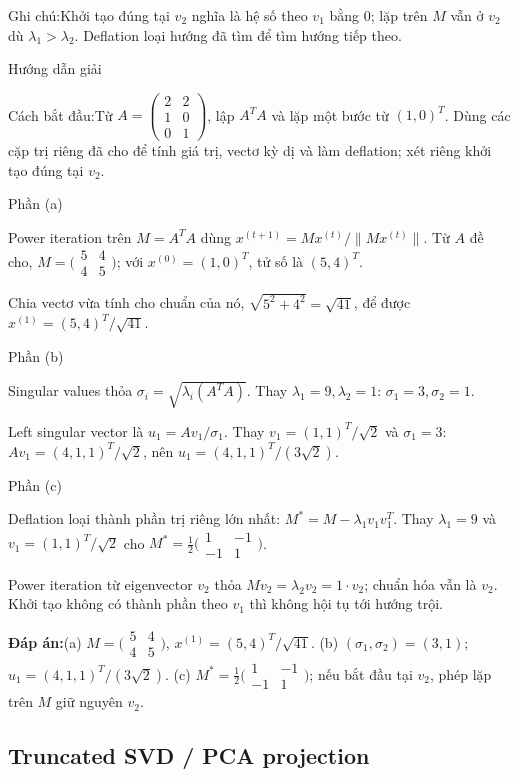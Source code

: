 \documentclass[10pt,a4paper,twocolumn]{article}
\makeatletter
\newcommand{\maptag}[1]{\phantomsection\@bsphack\protected@write\@auxout{}{\string\newlabel{#1}{{}{\thepage}{}{\@currentHref}{}}}\@esphack}
\newif\ifexamheadingprinted
\newcommand{\topic}[2]{%
  \global\examheadingprintedfalse\par\subsection{#2}\label{topic:#1}}
\newcommand{\key}[1]{#1:\enspace}
\newcommand{\solutionprompt}[1]{\par\addvspace{1pt}\noindent\key{Cách bắt đầu}#1\par\addvspace{2pt}}
\newcommand{\examnote}[1]{\par\addvspace{2pt}\noindent\key{Ghi chú}#1\par\addvspace{3pt}}
\newcommand{\blocklabel}[1]{\par\noindent#1\par\nobreak}
\newcommand{\answer}[1]{%
  \par\addvspace{3pt}%
  \blocklabel{#1Hướng dẫn giải}}
\newcommand{\finalanswer}[1]{%
  \par\addvspace{3pt}\noindent\textbf{Đáp án:}\nobreak\enspace#1\par}
\newcommand{\guidepart}[1]{%
  \par\addvspace{1.5pt}%
  \blocklabel{Phần #1}}
\makeatother
\begin{document}
\examnote{Khởi tạo đúng tại $v_2$ nghĩa là hệ số theo $v_1$ bằng 0; lặp trên $M$ vẫn ở $v_2$ dù $\lambda_1>\lambda_2$. Deflation loại hướng đã tìm để tìm hướng tiếp theo.}
\answer{\maptag{answer:Pr10}}
\solutionprompt{Từ $A=\left(\begin{smallmatrix}2&2\\1&0\\0&1\end{smallmatrix}\right)$, lập $A^TA$ và lặp một bước từ $(1,0)^T$. Dùng các cặp trị riêng đã cho để tính giá trị, vectơ kỳ dị và làm deflation; xét riêng khởi tạo đúng tại $v_2$.}
\guidepart{(a)}
\begin{guidesteps}
\item Power iteration trên $M=A^TA$ dùng $x^{(t+1)}=Mx^{(t)}/\|Mx^{(t)}\|$. Từ $A$ đề cho, $M=\bigl(\begin{smallmatrix}5&4\\4&5\end{smallmatrix}\bigr)$; với $x^{(0)}=(1,0)^T$, tử số là $(5,4)^T$.
\item Chia vectơ vừa tính cho chuẩn của nó, $\sqrt{5^2+4^2}=\sqrt{41}$, để được $x^{(1)}=(5,4)^T/\sqrt{41}$.
\end{guidesteps}
\guidepart{(b)}
\begin{guidesteps}
\item Singular values thỏa $\sigma_i=\sqrt{\lambda_i(A^TA)}$. Thay $\lambda_1=9,\lambda_2=1$: $\sigma_1=3,\sigma_2=1$.
\item Left singular vector là $u_1=Av_1/\sigma_1$. Thay $v_1=(1,1)^T/\sqrt2$ và $\sigma_1=3$: $Av_1=(4,1,1)^T/\sqrt2$, nên $u_1=(4,1,1)^T/(3\sqrt2)$.
\end{guidesteps}
\guidepart{(c)}
\begin{guidesteps}
\item Deflation loại thành phần trị riêng lớn nhất: $M^*=M-\lambda_1v_1v_1^T$. Thay $\lambda_1=9$ và $v_1=(1,1)^T/\sqrt2$ cho $M^*=\frac12\bigl(\begin{smallmatrix}1&-1\\-1&1\end{smallmatrix}\bigr)$.
\item Power iteration từ eigenvector $v_2$ thỏa $Mv_2=\lambda_2v_2=1\cdot v_2$; chuẩn hóa vẫn là $v_2$. Khởi tạo không có thành phần theo $v_1$ thì không hội tụ tới hướng trội.
\end{guidesteps}
\finalanswer{(a) $M=\bigl(\begin{smallmatrix}5&4\\4&5\end{smallmatrix}\bigr)$, $x^{(1)}=(5,4)^T/\sqrt{41}$. (b) $(\sigma_1,\sigma_2)=(3,1)$; $u_1=(4,1,1)^T/(3\sqrt2)$. (c) $M^*=\frac12\bigl(\begin{smallmatrix}1&-1\\-1&1\end{smallmatrix}\bigr)$; nếu bắt đầu tại $v_2$, phép lặp trên $M$ giữ nguyên $v_2$.}
\topic{pca}{Truncated SVD / PCA projection}
\end{document}
